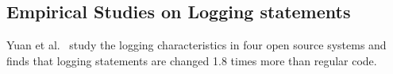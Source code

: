 %
%






\subsection{Empirical Studies on Logging statements}





 Yuan et al.~\cite{Characterizinglogs} study the logging characteristics in four open source systems and finds that logging statements are changed 1.8 times more than regular code.
 
